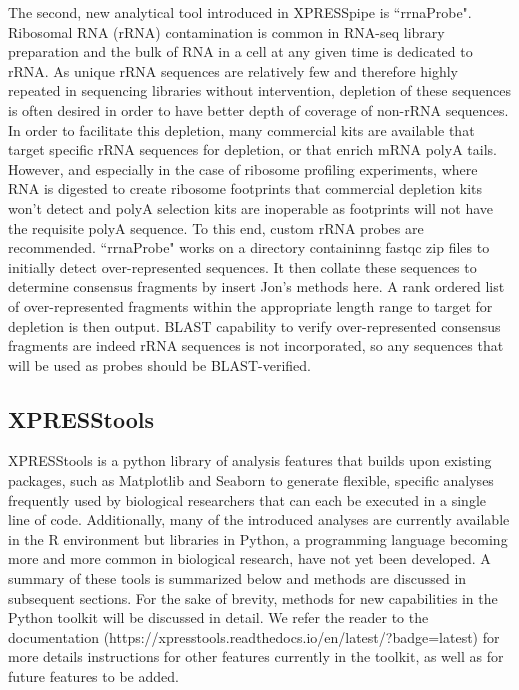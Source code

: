 \documentclass[11pt, a4paper, oneside]{article}
\begin{document}
The second, new analytical tool introduced in XPRESSpipe is ``rrnaProbe". Ribosomal RNA (rRNA) contamination is common in RNA-seq library preparation and the bulk of RNA in a cell at any given time is dedicated to rRNA. As unique rRNA sequences are relatively few and therefore highly repeated in sequencing libraries without intervention, depletion of these sequences is often desired in order to have better depth of coverage of non-rRNA sequences. In order to facilitate this depletion, many commercial kits are available that target specific rRNA sequences for depletion, or that enrich mRNA polyA tails. However, and especially in the case of ribosome profiling experiments, where RNA is digested to create ribosome footprints that commercial depletion kits won't detect and polyA selection kits are inoperable as footprints will not have the requisite polyA sequence. To this end, custom rRNA probes are recommended{}. ``rrnaProbe" works on a directory containinng fastqc{} zip files to initially detect over-represented sequences. It then collate these sequences to determine consensus fragments by {insert Jon's methods here}. A rank ordered list of over-represented fragments within the appropriate length range to target for depletion is then output. BLAST capability to verify over-represented consensus fragments are indeed rRNA sequences is not incorporated, so any sequences that will be used as probes should be BLAST-verified.

\subsection{XPRESStools}
XPRESStools is a python library of analysis features that builds upon existing packages, such as Matplotlib{} and Seaborn{} to generate flexible, specific analyses frequently used by biological researchers that can each be executed in a single line of code. Additionally, many of the introduced analyses are currently available in the R environment but libraries in Python, a programming language becoming more and more common in biological research, have not yet been developed. A summary of these tools is summarized below and methods are discussed in subsequent sections. For the sake of brevity, methods for new capabilities in the Python toolkit will be discussed in detail. We refer the reader to the documentation (https://xpresstools.readthedocs.io/en/latest/?badge=latest) for more details instructions for other features currently in the toolkit, as well as for future features to be added.
\end{document}
